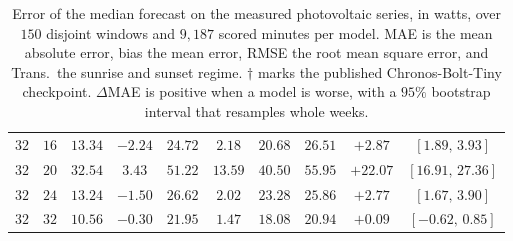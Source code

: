 \begin{table}[!tbp]
\begin{tabular}{@{}cccccccccc@{}}
        $32$ & $16$ & $13.34$ & $-2.24$ & $24.72$ & $2.18$ & $20.68$ & $26.51$ & $+2.87$ & $[1.89,\,3.93]$ \\
        $32$ & $20$ & $32.54$ & $3.43$ & $51.22$ & $13.59$ & $40.50$ & $55.95$ & $+22.07$ & $[16.91,\,27.36]$ \\
        $32$ & $24$ & $13.24$ & $-1.50$ & $26.62$ & $2.02$ & $23.28$ & $25.86$ & $+2.77$ & $[1.67,\,3.90]$ \\
        $32$ & $32$ & $10.56$ & $-0.30$ & $21.95$ & $1.47$ & $18.08$ & $20.94$ & $+0.09$ & $[-0.62,\,0.85]$ \\
        \bottomrule
    \end{tabular}
\caption{Error of the median forecast on the measured photovoltaic series, in watts, over $150$ disjoint windows and $9{,}187$ scored minutes per model. MAE is the mean absolute error, bias the mean error, RMSE the root mean square error, and Trans.\ the sunrise and sunset regime. $\dagger$ marks the published Chronos-Bolt-Tiny checkpoint. $\Delta$MAE is positive when a model is worse, with a $95\%$ bootstrap interval that resamples whole weeks.}%
    \label{tab:solarPrediction}
\end{table}
